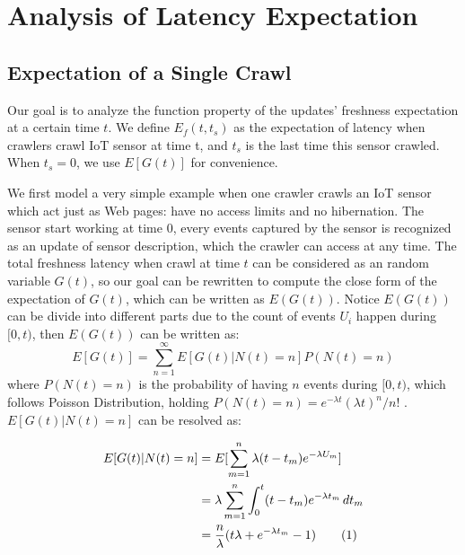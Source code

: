 \documentclass[conference]{IEEEtran}
\newcommand\numberthis{\addtocounter{equation}{1}\tag{\theequation}}
\begin{document}



%
%
%
%

\appendices
\section{Analysis of Latency Expectation}

\subsection{Expectation of a Single Crawl}

Our goal is to analyze the function property of the updates' freshness expectation at a certain time \(t\). We define \(E_f(t, t_s)\) as the expectation of latency when crawlers crawl IoT sensor at time t, and $t_s$ is the last time this sensor crawled. When $t_s=0$, we use $E[G(t)]$ for convenience.


We first model a very simple example when one crawler crawls an IoT sensor which act just as Web pages: have no access limits and no hibernation. The sensor start working at time \(0\), every events captured by the sensor is recognized as an update of sensor description, which the crawler can access at any time. 
The total freshness latency when crawl at time \(t\) can be considered as an random variable \(G(t)\), so our goal can be rewritten to compute the close form of the expectation of \(G(t)\), which can be written as \(E(G(t))\). 
Notice \(E(G(t))\) can be divide into different parts due to the count of events \(U_i\) happen during \([0, t)\), then \(E(G(t))\) can be written as:
\begin{equation}
E[G(t)] = \sum_{n=1}^{\infty} E[G(t)|N(t)=n]P(N(t)=n) \label{EG}
\end{equation}
where \(P(N(t)=n)\) is the probability of having \(n\) events during \([0,t)\), which follows Poisson Distribution, holding \(P(N(t)=n)=e^{-\lambda t}{(\lambda t)^n}/{n!} \) . \(E[G(t)|N(t)=n]\) can be resolved as:

\begin{align*}
E[G(t)|N(t)=n] &= E[\sum_{m=1}^{n} \lambda (t-t_{m})e^{-\lambda U_m}]\\
&= \lambda \sum_{m=1}^{n} \int_{0}^{t} (t-t_m)e^{-\lambda t_m}\,d{t_m}\\
&= \frac{n}{\lambda}(t\lambda+e^{-\lambda t_m}-1)\numberthis \label{EGN}
\end{align*}
\end{document}
